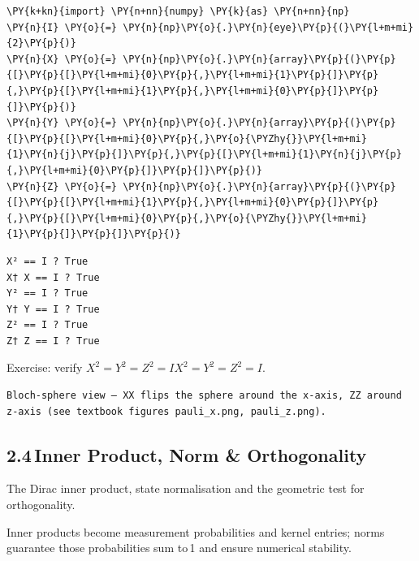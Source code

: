 \begin{tcolorbox}[breakable, size=fbox, boxrule=1pt, pad at break*=1mm,colback=cellbackground, colframe=cellborder]
\begin{Verbatim}[commandchars=\\\{\}]
\PY{k+kn}{import} \PY{n+nn}{numpy} \PY{k}{as} \PY{n+nn}{np}
\PY{n}{I} \PY{o}{=} \PY{n}{np}\PY{o}{.}\PY{n}{eye}\PY{p}{(}\PY{l+m+mi}{2}\PY{p}{)}
\PY{n}{X} \PY{o}{=} \PY{n}{np}\PY{o}{.}\PY{n}{array}\PY{p}{(}\PY{p}{[}\PY{p}{[}\PY{l+m+mi}{0}\PY{p}{,}\PY{l+m+mi}{1}\PY{p}{]}\PY{p}{,}\PY{p}{[}\PY{l+m+mi}{1}\PY{p}{,}\PY{l+m+mi}{0}\PY{p}{]}\PY{p}{]}\PY{p}{)}
\PY{n}{Y} \PY{o}{=} \PY{n}{np}\PY{o}{.}\PY{n}{array}\PY{p}{(}\PY{p}{[}\PY{p}{[}\PY{l+m+mi}{0}\PY{p}{,}\PY{o}{\PYZhy{}}\PY{l+m+mi}{1}\PY{n}{j}\PY{p}{]}\PY{p}{,}\PY{p}{[}\PY{l+m+mi}{1}\PY{n}{j}\PY{p}{,}\PY{l+m+mi}{0}\PY{p}{]}\PY{p}{]}\PY{p}{)}
\PY{n}{Z} \PY{o}{=} \PY{n}{np}\PY{o}{.}\PY{n}{array}\PY{p}{(}\PY{p}{[}\PY{p}{[}\PY{l+m+mi}{1}\PY{p}{,}\PY{l+m+mi}{0}\PY{p}{]}\PY{p}{,}\PY{p}{[}\PY{l+m+mi}{0}\PY{p}{,}\PY{o}{\PYZhy{}}\PY{l+m+mi}{1}\PY{p}{]}\PY{p}{]}\PY{p}{)}
\end{Verbatim}
\end{tcolorbox}

    \begin{Verbatim}[commandchars=\\\{\}]
X² == I ? True
X† X == I ? True
Y² == I ? True
Y† Y == I ? True
Z² == I ? True
Z† Z == I ? True
    \end{Verbatim}

    Exercise: verify \(X^2=Y^2=Z^2=IX^2=Y^2=Z^2=I\).

\begin{verbatim}
Bloch‑sphere view — XX flips the sphere around the x‑axis, ZZ around z‑axis (see textbook figures pauli_x.png, pauli_z.png).
\end{verbatim}

    \hypertarget{inner-product-norm-orthogonality}{%
\subsection*{2.4\,Inner Product, Norm \&
Orthogonality}\label{inner-product-norm-orthogonality}}

The Dirac inner product, state normalisation and the geometric test for
orthogonality.

Inner products become measurement probabilities and kernel entries;
norms guarantee those probabilities sum to\,1 and ensure numerical
stability.

